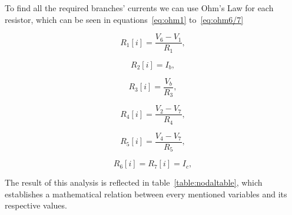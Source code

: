 To find all the required branches' currents we can use Ohm's Law for each resistor, which can be seen in equations~\ref{eq:ohm1} to~\ref{eq:ohm6/7}

\begin{equation}
  R_1[i] = \frac{V_6 - V_1}{R_1},
  \label{eq:ohm1}
\end{equation}

\begin{equation}
  R_2[i]= I_b,
  \label{eq:ohm2}
\end{equation}

\begin{equation}
  R_3[i] = \frac{V_b}{R_3},
  \label{eq:ohm3}
\end{equation}

\begin{equation}
  R_4[i] = \frac{V_2-V_7}{R_4},
  \label{eq:ohm4}
\end{equation}

\begin{equation}
  R_5[i] = \frac{V_4-V_7}{R_5},
  \label{eq:ohm5}
\end{equation}

\begin{equation}
  R_6[i] = R_7[i] = I_c,
  \label{eq:ohm6/7}
\end{equation}

The result of this analysis is reflected in table~\ref{table:nodaltable}, which establishes a mathematical relation between every mentioned variables and its respective values. 


